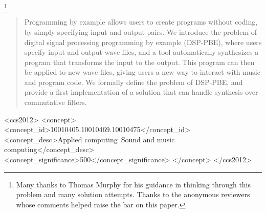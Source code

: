 \documentclass[sigplan]{acmart}\settopmatter{}
\begin{document}
\author{Ruzica Piskac}






\thanks{Many thanks to Thomas Murphy for his guidance in thinking through this problem and many solution attempts. Thanks to the anonymous reviewers whose comments helped raise the bar on this paper.}       %


\begin{abstract}
Programming by example allows users to create programs without coding, by simply specifying input and output pairs.
We introduce the problem of digital signal processing programming by example (DSP-PBE), where users specify input and output wave files, and a tool automatically synthesizes a program that transforms the input to the output.
This program can then be applied to new wave files, giving users a new way to interact with music and program code.
We formally define the problem of DSP-PBE, and provide a first implementation of a solution that can handle synthesis over commutative filters.
\end{abstract}


\begin{CCSXML}
  <ccs2012>
  <concept>
  <concept_id>10010405.10010469.10010475</concept_id>
  <concept_desc>Applied computing~Sound and music computing</concept_desc>
  <concept_significance>500</concept_significance>
  </concept>
  </ccs2012>
\end{CCSXML}
\end{document}
